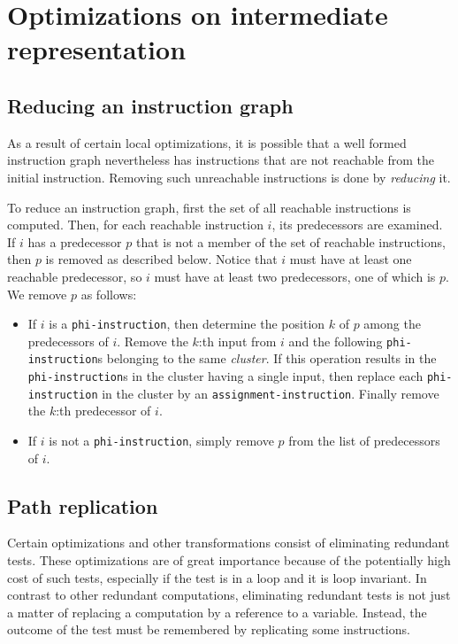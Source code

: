 \chapter{Optimizations on intermediate representation}

\section{Reducing an instruction graph}
\label{mir-optimizations-reduction}

As a result of certain local optimizations, it is possible that a well
formed instruction graph nevertheless has instructions that are not
reachable from the initial instruction.  Removing such unreachable
instructions is done by \emph{reducing} it.

To reduce an instruction graph, first the set of all reachable
instructions is computed.  Then, for each reachable instruction $i$,
its predecessors are examined.  If $i$ has a predecessor $p$ that is
not a member of the set of reachable instructions, then $p$ is removed
as described below.  Notice that $i$ must have at least one reachable
predecessor, so $i$ must have at least two predecessors, one of which
is $p$.  We remove $p$ as follows:

\begin{itemize}
\item If $i$ is a \texttt{phi-instruction}, then determine the
  position $k$ of $p$ among the predecessors of $i$.  Remove the
  $k$:th input from $i$ and the following \texttt{phi-instruction}s
  belonging to the same \emph{cluster}.  If this operation results in
  the \texttt{phi-instruction}s in the cluster having a single input,
  then replace each \texttt{phi-instruction} in the cluster by an
  \texttt{assignment-instruction}.  Finally remove the $k$:th
  predecessor of $i$.
\item If $i$ is not a \texttt{phi-instruction}, simply remove $p$ from
  the list of predecessors of $i$.
\end{itemize}

\section{Path replication}
\label{hir-optimizations-path-replication}

Certain optimizations and other transformations consist of eliminating
redundant tests.  These optimizations are of great importance because
of the potentially high cost of such tests, especially if the test is
in a loop and it is loop invariant.  In contrast to other redundant
computations, eliminating redundant tests is not just a matter of
replacing a computation by a reference to a variable.  Instead, the
outcome of the test must be remembered by replicating some
instructions.

